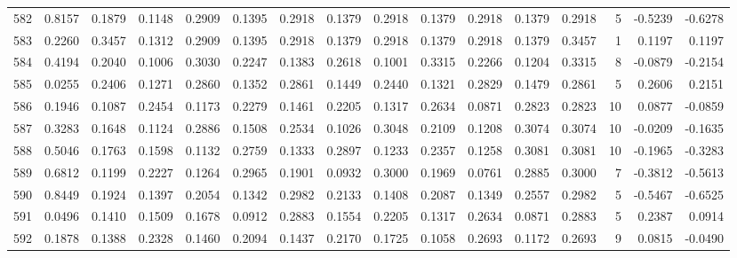 \begin{tabular}{lrrrrrrrrrrrrrrr}
582 &      0.8157 &  0.1879 &  0.1148 &  0.2909 &  0.1395 &  0.2918 &  0.1379 &  0.2918 &  0.1379 &  0.2918 &   0.1379 &     0.2918 &      5 &                   -0.5239 &                    -0.6278 \\
583 &      0.2260 &  0.3457 &  0.1312 &  0.2909 &  0.1395 &  0.2918 &  0.1379 &  0.2918 &  0.1379 &  0.2918 &   0.1379 &     0.3457 &      1 &                    0.1197 &                     0.1197 \\
584 &      0.4194 &  0.2040 &  0.1006 &  0.3030 &  0.2247 &  0.1383 &  0.2618 &  0.1001 &  0.3315 &  0.2266 &   0.1204 &     0.3315 &      8 &                   -0.0879 &                    -0.2154 \\
585 &      0.0255 &  0.2406 &  0.1271 &  0.2860 &  0.1352 &  0.2861 &  0.1449 &  0.2440 &  0.1321 &  0.2829 &   0.1479 &     0.2861 &      5 &                    0.2606 &                     0.2151 \\
586 &      0.1946 &  0.1087 &  0.2454 &  0.1173 &  0.2279 &  0.1461 &  0.2205 &  0.1317 &  0.2634 &  0.0871 &   0.2823 &     0.2823 &     10 &                    0.0877 &                    -0.0859 \\
587 &      0.3283 &  0.1648 &  0.1124 &  0.2886 &  0.1508 &  0.2534 &  0.1026 &  0.3048 &  0.2109 &  0.1208 &   0.3074 &     0.3074 &     10 &                   -0.0209 &                    -0.1635 \\
588 &      0.5046 &  0.1763 &  0.1598 &  0.1132 &  0.2759 &  0.1333 &  0.2897 &  0.1233 &  0.2357 &  0.1258 &   0.3081 &     0.3081 &     10 &                   -0.1965 &                    -0.3283 \\
589 &      0.6812 &  0.1199 &  0.2227 &  0.1264 &  0.2965 &  0.1901 &  0.0932 &  0.3000 &  0.1969 &  0.0761 &   0.2885 &     0.3000 &      7 &                   -0.3812 &                    -0.5613 \\
590 &      0.8449 &  0.1924 &  0.1397 &  0.2054 &  0.1342 &  0.2982 &  0.2133 &  0.1408 &  0.2087 &  0.1349 &   0.2557 &     0.2982 &      5 &                   -0.5467 &                    -0.6525 \\
591 &      0.0496 &  0.1410 &  0.1509 &  0.1678 &  0.0912 &  0.2883 &  0.1554 &  0.2205 &  0.1317 &  0.2634 &   0.0871 &     0.2883 &      5 &                    0.2387 &                     0.0914 \\
592 &      0.1878 &  0.1388 &  0.2328 &  0.1460 &  0.2094 &  0.1437 &  0.2170 &  0.1725 &  0.1058 &  0.2693 &   0.1172 &     0.2693 &      9 &                    0.0815 &                    -0.0490 \\

\end{tabular}
